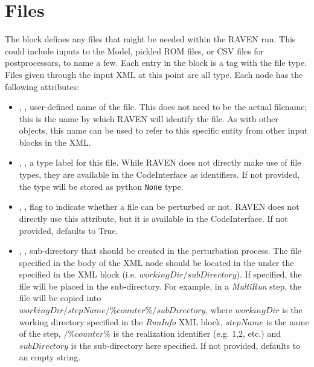 \section{Files}
\label{sec:files}

The  block defines any files that might be needed within
the RAVEN run.  This could include inputs to the Model, pickled ROM files,
or CSV files for postprocessors, to name a few.
%
Each entry in the  block is a tag with the file type.  Files
given through the input XML at this point are all  type.
Each  node has the following attributes:
\vspace{-5mm}
\begin{itemize}
  \itemsep0em
  \item {}, , user-defined name
  of the file.  This does not need to be the actual filename; this is the name
  by which RAVEN will identify the file.
  \nb As with other objects, this name can be used to refer to this
  specific entity from other input blocks in the XML.
  \item {}, , a type label
  for this file.  While RAVEN does not directly make use of file types,
  they are available in the CodeInterface as identifiers.  If not provided,
  the type will be stored as python \texttt{None} type.

  \item {}, , flag
  to indicate whether a file can be perturbed or not. RAVEN does not
  directly use this attribute, but it is available in the CodeInterface.
  If not provided, defaults to True.
  
  \item {}, , sub-directory
  that should be created in the perturbation process. The file specified in the body of the 
  XML node should be located in the   under the   specified
  in the  XML block (i.e. $workingDir/subDirectory$).
  If specified, the file will be
  placed in the sub-directory. For example, in a \textit{MultiRun} step, 
  the file will be copied into \\$workingDir/stepName/\%counter\%/subDirectory$, where $workingDir$
  is the working directory specified in the \textit{RunInfo} XML block, $stepName$ is the name of the step, 
  $/\%counter\%$ is the realization identifier (e.g. $1$,$2$, etc.) and $subDirectory$ is the sub-directory here
  specified.
  If not provided, defaults to an empty string.
\end{itemize}
